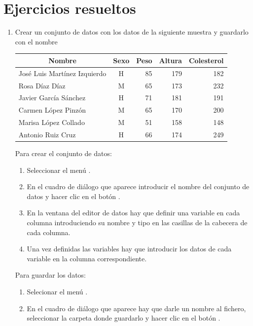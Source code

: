 \section{Ejercicios resueltos}
\begin{enumerate}[leftmargin=*]
\item Crear un conjunto de datos con los datos de la siguiente muestra y guardarlo con el nombre
\begin{center}
\begin{tabular}{|l|c|r|r|r|}
\hline
\multicolumn{1}{|c|}{Nombre} & \multicolumn{1}{c|}{Sexo} & \multicolumn{1}{c|}{Peso} & \multicolumn{1}{c|}{Altura} & \multicolumn{1}{c|}{Colesterol}\\
\hline
José Luis Martínez Izquierdo  & H &  85 & 179 & 182\\
Rosa Díaz Díaz & M & 65 & 173 & 232\\
Javier García Sánchez  & H & 71 & 181 & 191\\
Carmen López Pinzón & M &  65 & 170 & 200\\
Marisa López Collado & M &  51 & 158 & 148\\
Antonio Ruiz Cruz & H & 66 & 174 & 249\\
\hline
\end{tabular}
\end{center}

\begin{indicacion}
Para crear el conjunto de datos:
\begin{enumerate}
\item Seleccionar el menú .
\item En el cuadro de diálogo que aparece introducir el nombre del conjunto de datos  y hacer clic en el botón .
\item En la ventana del editor de datos hay que definir una variable en cada columna introduciendo su nombre y tipo en las casillas de la cabecera de cada columna.
\item Una vez definidas las variables hay que introducir los datos de cada variable en la columna correspondiente. 
\end{enumerate}
Para guardar los datos:
\begin{enumerate}
\item Selecionar el menú .
\item En el cuadro de diálogo que aparece hay que darle un nombre al fichero, seleccionar la carpeta donde guardarlo y hacer clic en el
botón .
\end{enumerate}
\end{indicacion}


\end{enumerate}
